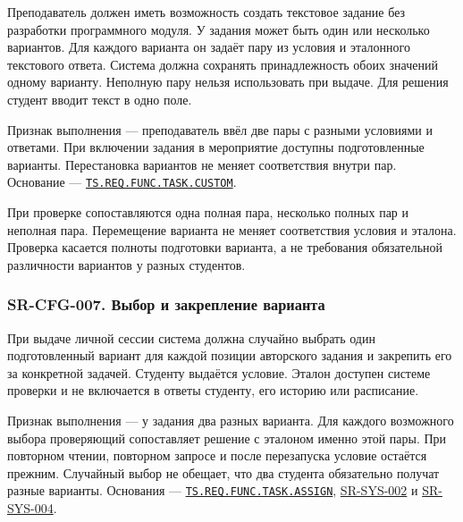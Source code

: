 \documentclass[12pt,a4paper]{article}
\begin{document}
\hypertarget{sr-cfg-006-авторское-задание-с-вариантами}{}

\hypertarget{sr-cfg-006}{}

Преподаватель должен иметь возможность создать текстовое задание без разработки программного модуля. У задания может быть один или несколько вариантов. Для каждого варианта он задаёт пару из условия и эталонного текстового ответа. Система должна сохранять принадлежность обоих значений одному варианту. Неполную пару нельзя использовать при выдаче. Для решения студент вводит текст в одно поле.

Признак выполнения --- преподаватель ввёл две пары с разными условиями и ответами. При включении задания в мероприятие доступны подготовленные варианты. Перестановка вариантов не меняет соответствия внутри пар. Основание --- {\href{../02\_Техническое\_задание/DOC-02\_Техническое\_задание.pdf\#ts-req-func-task-custom}{\texttt{TS.\allowbreak{}REQ.\allowbreak{}FUNC.\allowbreak{}TASK.\allowbreak{}CUSTOM}}}.

При проверке сопоставляются одна полная пара, несколько полных пар и неполная пара. Перемещение варианта не меняет соответствия условия и эталона. Проверка касается полноты подготовки варианта, а не требования обязательной различности вариантов у разных студентов.

\subsubsection{SR-CFG-007. Выбор и закрепление варианта}\label{sr-cfg-007-ux432ux44bux431ux43eux440-ux438-ux437ux430ux43aux440ux435ux43fux43bux435ux43dux438ux435-ux432ux430ux440ux438ux430ux43dux442ux430}

\hypertarget{sr-cfg-007-выбор-и-закрепление-варианта}{}

\hypertarget{sr-cfg-007}{}

При выдаче личной сессии система должна случайно выбрать один подготовленный вариант для каждой позиции авторского задания и закрепить его за конкретной задачей. Студенту выдаётся условие. Эталон доступен системе проверки и не включается в ответы студенту, его историю или расписание.

Признак выполнения --- у задания два разных варианта. Для каждого возможного выбора проверяющий сопоставляет решение с эталоном именно этой пары. При повторном чтении, повторном запросе и после перезапуска условие остаётся прежним. Случайный выбор не обещает, что два студента обязательно получат разные варианты. Основания --- {\href{../02\_Техническое\_задание/DOC-02\_Техническое\_задание.pdf\#ts-req-func-task-assign}{\texttt{TS.\allowbreak{}REQ.\allowbreak{}FUNC.\allowbreak{}TASK.\allowbreak{}ASSIGN}}}, {\hyperlink{sr-sys-002}{SR-SYS-002}} и {\hyperlink{sr-sys-004}{SR-SYS-004}}.
\end{document}
